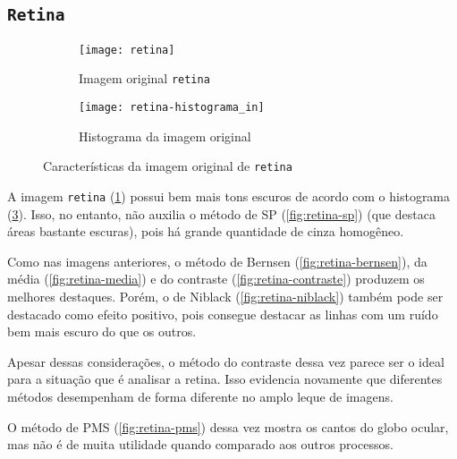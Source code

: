 \documentclass[brazilian,a4paper,twocolumn]{article}
\begin{document}
    \subsection{\texttt{Retina}}
    \label{sec:retina}

        \begin{figure}[h]
            \centering
            \begin{subfigure}{0.30\textwidth}
                \texttt{[image: retina]}
                \caption{Imagem original \texttt{retina}}
                \label{fig:retina}
            \end{subfigure}
            \begin{subfigure}{0.5\textwidth}
                \texttt{[image: retina-histograma\_in]}
                \caption{Histograma da imagem original}
                \label{fig:retina-histograma}
            \end{subfigure}

            \caption{Características da imagem original de \texttt{retina}}
        \end{figure}

        A imagem \texttt{retina} (\cref{fig:retina}) possui bem mais tons escuros de acordo com o histograma (\cref{fig:retina-histograma}). Isso, no entanto, não auxilia o método de SP (\cref{fig:retina-sp}) (que destaca áreas bastante escuras), pois há grande quantidade de cinza homogêneo.

        Como nas imagens anteriores, o método de Bernsen (\cref{fig:retina-bernsen}), da média (\cref{fig:retina-media}) e do contraste (\cref{fig:retina-contraste}) produzem os melhores destaques. Porém, o de Niblack (\cref{fig:retina-niblack}) também pode ser destacado como efeito positivo, pois consegue destacar as linhas com um ruído bem mais escuro do que os outros.

        Apesar dessas considerações, o método do contraste dessa vez parece ser o ideal para a situação que é analisar a retina. Isso evidencia novamente que diferentes métodos desempenham de forma diferente no amplo leque de imagens.

        O método de PMS (\cref{fig:retina-pms}) dessa vez mostra os cantos do globo ocular, mas não é de muita utilidade quando comparado aos outros processos.
\end{document}
